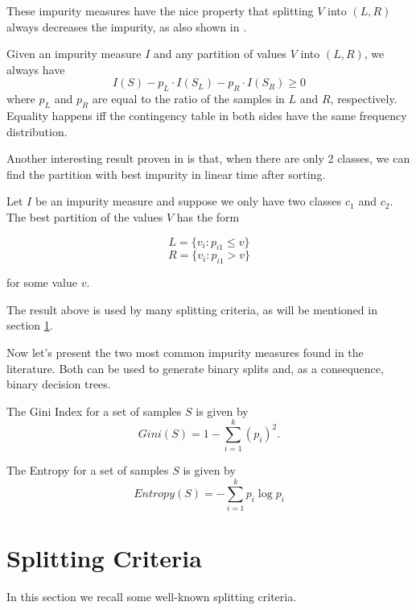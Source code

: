 These impurity measures have the nice property that splitting $V$ into $(L, R)$ always decreases the impurity, as also shown in \cite{Breiman84}.

\begin{theorem}
Given an impurity measure $I$ and any partition of values $V$ into $(L, R)$, we always have
$$I(S) - p_L \cdot I(S_L) - p_R \cdot I(S_R) \geq 0 $$
where $p_L$ and $p_R$ are equal to the ratio of the samples in $L$ and $R$, respectively. Equality happens iff the contingency table in both sides have the same frequency distribution.
\end{theorem}

Another interesting result proven in \cite{Breiman84} is that, when there are only 2 classes, we can find the partition with best impurity in linear time after sorting.

\begin{theorem}
\label{thm:two-class-trick}
Let $I$ be an impurity measure and suppose we only have two classes $c_1$ and $c_2$. The best partition of the values $V$ has the form

$$L = \{v_i : p_{i1} \leq v\}$$
$$R = \{v_i : p_{i1} > v\}$$

for some value $v$.
\end{theorem}

The result above is used by many splitting criteria, as will be mentioned in section \ref{sec:splitting-criteria}.

Now let's present the two most common impurity measures found in the literature. Both can be used to generate binary splits and, as a consequence, binary decision trees.

\begin{definition}
\label{def:Gini}
The Gini Index for a set of samples $S$ is given by 
\begin{equation}
 Gini(S) =  1- \sum_{i=1}^k (p_i)^2 .
\label{eq:gini}
\end{equation}
\end{definition}

\begin{definition}
The Entropy for a set of samples $S$ is given by 
\begin{equation}
 Entropy(S) =  - \sum_{i=1}^k p_i \log p_i
\label{eq:entropy}
\end{equation}
\end{definition}

\section{Splitting Criteria}
\label{sec:splitting-criteria}
In this section we recall some well-known splitting criteria.

